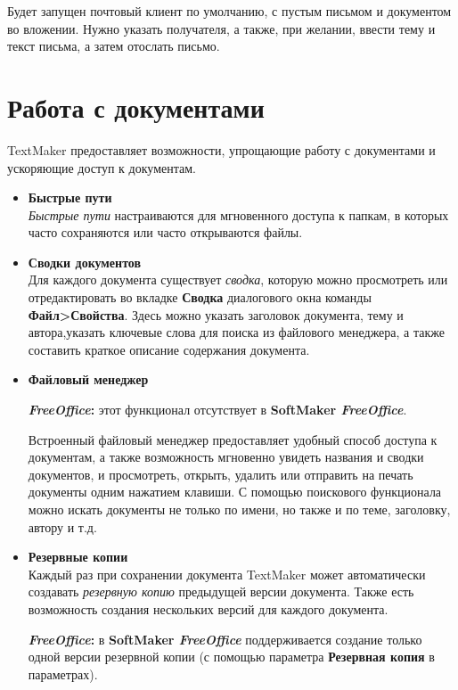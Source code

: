 ﻿\documentclass[a4paper,10pt]{article}
\begin{document}
Будет запущен почтовый клиент по умолчанию, с пустым письмом и документом во вложении. Нужно указать получателя, а также, при желании, ввести тему и текст письма, а затем отослать письмо.

\section{Работа с документами} \label{sec:работасдокументами}
TextMaker предоставляет возможности, упрощающие работу с документами и ускоряющие доступ к документам.

\begin{itemize}
 \item \textbf{Быстрые пути}\\
 \textit{Быстрые пути} настраиваются для мгновенного доступа к папкам, в которых часто сохраняются или часто открываются файлы.
 \item \textbf{Сводки документов}\\
 Для каждого документа существует \textit{сводка}, которую можно просмотреть или отредактировать во вкладке \textbf{Сводка} диалогового окна команды \textbf{Файл>Свойства}. Здесь можно указать заголовок документа, тему и автора,указать ключевые слова для поиска из файлового менеджера, а также составить краткое описание содержания документа.
 \item \textbf{Файловый менеджер}\\
 \begin{mdframed}[backgroundcolor=pink!50]
\textbf{\textit{FreeOffice}:} этот функционал отсутствует в \textbf{SoftMaker \textit{FreeOffice}}.
\end{mdframed}
Встроенный файловый менеджер предоставляет удобный способ доступа к документам, а также возможность мгновенно увидеть названия и сводки документов, и просмотреть, открыть, удалить или отправить на печать документы одним нажатием клавиши. С помощью поискового функционала можно искать документы не только по имени, но также и по теме, заголовку, автору и т.д.
\item \textbf{Резервные копии}\\
Каждый раз при сохранении документа TextMaker может автоматически создавать \textit{резервную копию} предыдущей версии документа. Также есть возможность создания нескольких версий для каждого документа.

\begin{mdframed}[backgroundcolor=pink!50]
\textbf{\textit{FreeOffice}:} в \textbf{SoftMaker \textit{FreeOffice}} поддерживается создание только одной версии резервной копии (с помощью параметра \textbf{Резервная копия} в параметрах).
\end{mdframed}
\end{itemize}
\end{document}
